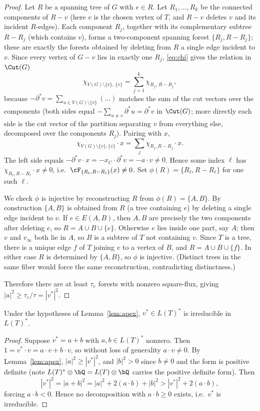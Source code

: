 \begin{proof}
Let $R$ be a spanning tree of $G$ with $e\in R$. Let $R_1,\dots,R_k$ be the
connected components of $R-v$ (here $v$ is the chosen vertex of $T$, and $R-v$
deletes $v$ and its incident $R$-edges). Each component $R_j$, together with its
complementary subtree $R-R_j$ (which contains $v$), forms a two-component
spanning forest $\{R_j,R-R_j\}$; these are exactly the forests obtained by
deleting from $R$ a single edge incident to $v$. Since every vertex of $G-v$
lies in exactly one $R_j$, \eqref{eq:chi} gives the relation in $\Cut(G)$
\[
\chi_{V(G)\setminus\{v\},\,\{v\}}=\sum_{j=1}^{k}\chi_{R_j,\,R-R_j},
\]
because $-\partial^{*}v=\sum_{u\in V(G)\setminus\{v\}}(\dots)$ matches the
sum of the cut vectors over the components (both sides equal
$-\sum_{u\neq v}\partial^{*}u = \partial^* v$ in $\Cut(G)$; more directly each
side is the cut vector of the partition separating $v$ from everything else,
decomposed over the components $R_j$). Pairing with $x$,
\[
\chi_{V(G)\setminus\{v\},\{v\}}\cdot x=\sum_{j}\chi_{R_j,R-R_j}\cdot x .
\]
The left side equals $-\partial^{*}v\cdot x=-x_C\cdot\partial^{*}v=-a\cdot
v\neq0$. Hence some index $\ell$ has $\chi_{R_\ell,R-R_\ell}\cdot x\neq0$, i.e.\
$\cF_{\{R_\ell,R-R_\ell\}}(x)\neq0$. Set $\phi(R)=\{R_\ell,R-R_\ell\}$ for one
such $\ell$.

We check $\phi$ is injective by reconstructing $R$ from $\phi(R)=\{A,B\}$. By
construction $\{A,B\}$ is obtained from $R$ (a tree containing $e$) by deleting a
single edge incident to $v$. If $e\in E(A,B)$, then $A,B$ are precisely the two
components after deleting $e$, so $R=A\cup B\cup\{e\}$. Otherwise $e$ lies inside
one part, say $A$; then $v$ and $v_\infty$ both lie in $A$, so $B$ is a subtree
of $T$ not containing $v$. Since $T$ is a tree, there is a unique edge $f$ of $T$
joining $v$ to a vertex of $B$, and $R=A\cup B\cup\{f\}$. In either case $R$ is
determined by $\{A,B\}$, so $\phi$ is injective. (Distinct trees in the same
fiber would force the same reconstruction, contradicting distinctness.)

Therefore there are at least $\tau_e$ forests with nonzero square-flux, giving
$|a|^2\geq\tau_e/\tau=|v^{*}|^2$.
\end{proof}

\begin{cor}\label{cor:apex}
Under the hypotheses of Lemma~\ref{lem:apex}, $v^{*}\in L(T)^{*}$ is irreducible
in $L(T)^{*}$.
\end{cor}

\begin{proof}
Suppose $v^{*}=a+b$ with $a,b\in L(T)^{*}$ nonzero. Then
$1=v^{*}\cdot v=a\cdot v+b\cdot v$, so without loss of generality $a\cdot
v\neq0$. By Lemma~\ref{lem:apex}, $|a|^2\geq|v^{*}|^2$, and $|b|^2>0$ since
$b\neq0$ and the form is positive definite (note $L(T)^{*}\otimes\bQ=L(T)\otimes
\bQ$ carries the positive definite form). Then
\[
|v^{*}|^2=|a+b|^2=|a|^2+2(a\cdot b)+|b|^2>|v^{*}|^2+2(a\cdot b),
\]
forcing $a\cdot b<0$. Hence no decomposition with $a\cdot b\geq0$ exists, i.e.\
$v^{*}$ is irreducible.
\end{proof}

